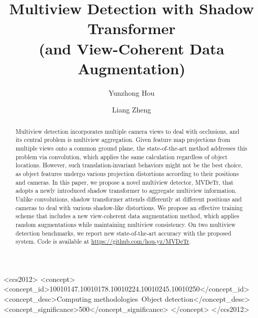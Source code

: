 \documentclass[sigconf,authorversion,nonacm]{acmart}
\begin{document}
\fancyhead{}

\title{Multiview Detection with Shadow Transformer\\ (and View-Coherent Data Augmentation)}




\author{Yunzhong Hou}
  
  
\author{Liang Zheng}

\renewcommand{\shortauthors}{Trovato and Tobin, et al.}


\begin{abstract}


Multiview detection incorporates multiple camera views to deal with occlusions, and its central problem is multiview aggregation. Given feature map projections from multiple views onto a common ground plane, the state-of-the-art method addresses this problem via convolution, which applies the same calculation regardless of object locations. However, such translation-invariant behaviors might not be the best choice, as object features undergo various projection distortions according to their positions and cameras. In this paper, we propose a novel multiview detector, MVDeTr, that adopts a newly introduced shadow transformer to aggregate multiview information. Unlike convolutions, shadow transformer attends differently at different positions and cameras to deal with various shadow-like distortions. We propose an effective training scheme that includes a new view-coherent data augmentation method, which applies random augmentations while maintaining multiview consistency. On two multiview detection benchmarks, we report new state-of-the-art accuracy with the proposed system. Code is available at \url{https://github.com/hou-yz/MVDeTr}.







\end{abstract}

\begin{CCSXML}
<ccs2012>
<concept>
<concept_id>10010147.10010178.10010224.10010245.10010250</concept_id>
<concept_desc>Computing methodologies~Object detection</concept_desc>
<concept_significance>500</concept_significance>
</concept>
</ccs2012>
\end{CCSXML}
\end{document}
